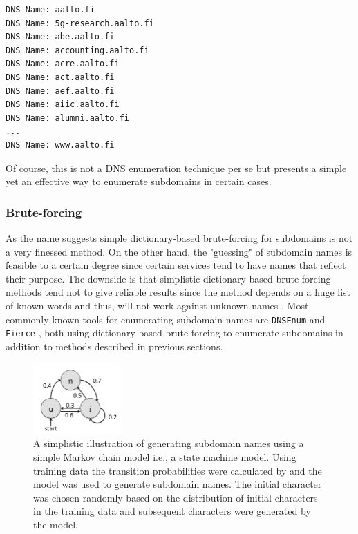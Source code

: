 \begin{verbatim}
DNS Name: aalto.fi
DNS Name: 5g-research.aalto.fi
DNS Name: abe.aalto.fi
DNS Name: accounting.aalto.fi
DNS Name: acre.aalto.fi
DNS Name: act.aalto.fi
DNS Name: aef.aalto.fi
DNS Name: aiic.aalto.fi
DNS Name: alumni.aalto.fi
...
DNS Name: www.aalto.fi
\end{verbatim}

Of course, this is not a DNS enumeration technique per se but presents a simple yet an effective way to enumerate subdomains in certain cases.

\subsubsection{Brute-forcing}

As the name suggests simple dictionary-based brute-forcing for subdomains is not a very finessed method. On the other hand, the "guessing" of subdomain names is feasible to a certain degree since certain services tend to have names that reflect their purpose. The downside is that simplistic dictionary-based brute-forcing methods tend not to give reliable results since the method depends on a huge list of known words and
thus, will not work against unknown names \cite{SMART_BRUTE}. Most commonly known tools for enumerating subdomain names are \texttt{DNSEnum} \cite{dnsenum} and \texttt{Fierce} \cite{fierce}, both using dictionary-based brute-forcing to enumerate subdomains in addition to methods described in previous sections.

\begin{figure}[h]
  \begin{center}
    \includegraphics[width=0.3\textwidth]{markov.png}
    \caption{A simplistic illustration of generating subdomain names using a simple Markov chain model i.e., a state machine model. Using training data the transition probabilities were calculated by \citet{SMART_BRUTE} and the model was used to generate subdomain names. The initial character was chosen randomly based on the distribution of initial characters in the training data and subsequent characters were generated by the model.} 
    \label{fig:markov}
  \end{center}
\end{figure}

